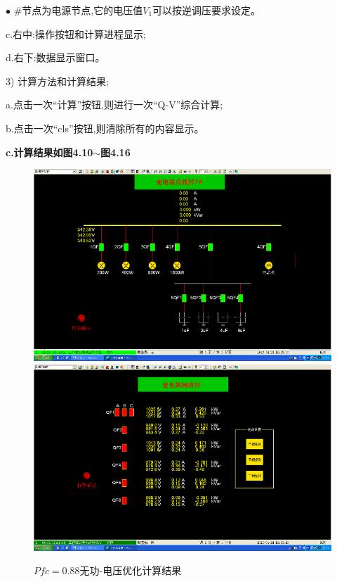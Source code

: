 \documentclass[a4paper]{ctexrep}
\begin{document}
                    \qquad $\bullet$ \#节点为电源节点,它的电压值$V_1$可以按逆调压要求设定。
                    
                    \quad c.右中:操作按钮和计算进程显示;
                
                    \quad d.右下:数据显示窗口。

                    3) 计算方法和计算结果;

                    \quad a.点击一次“计算”按钮,则进行一次“Q-V”综合计算;
                    
                    \quad b.点击一次“cls”按钮,则清除所有的内容显示。
                    
                    \quad \textbf{c.计算结果如图4.10$\sim$图4.16}

                    \begin{figure}[htbp]
                        \centering
                        \includegraphics[width=12cm]{12.png} 
                        \includegraphics[width=12cm]{13.png} 
                        \caption{$Pfc=0.88$无功-电压优化计算结果}
                    \end{figure}
\end{document}
